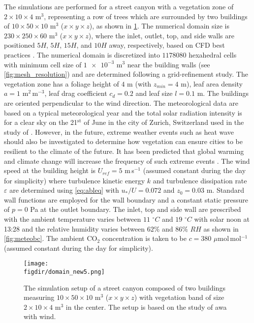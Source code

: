 The simulations are performed for a street canyon with a vegetation zone of $2 \times 10 \times 4$ m$^3$, representing a row of trees which are surrounded by two buildings of $10 \times 50 \times 10$ m$^3$ ($x\times y \times z$), as shown in \cref{fig:domain_new5}. The numerical domain size is $230\times 250 \times 60$ m$^3$  ($x\times y \times z$), where the inlet, outlet, top, and side walls are positioned $5 H$, $5 H$, $15 H$, and $10 H$ away, respectively, based on CFD best practices \citep{Blocken2015, Franke2007, Tominaga2008}. The numerical domain is discretized into $\num{1178080}$ hexahedral cells with minimum cell size of $\num{1e-3}$ m$^{3}$ near the building walls (see \cref{fig:mesh_resolution}) and are determined following a grid-refinement study. The vegetation zone has a foliage height of $4$ m (with $z_{\textit{min}}= 4$ m), leaf area density $a= 1$ m$^2$\,m$^{-3}$, leaf drag coefficient $c_d=0.2$ and leaf size $l=0.1$ m. The buildings are oriented perpendicular to the wind direction. The meteorological data are based on a typical meteorological year and the total solar radiation intensity is for a clear sky on the 21$^{\mathrm{st}}$ of June in the city of Zurich, Switzerland used in the study of \cite{Kubilay2018}. However, in the future, extreme weather events such as heat wave should also be investigated to determine how vegetation can ensure cities to be resilient to the climate of the future. It has been predicted that global warming and climate change will increase the frequency of such extreme events \citep{Mitchell2016}. The wind speed at the building height is $U_{\textit{ref}}=5$ m\,s$^{-1}$ (assumed constant during the day for simplicity) where turbulence kinetic energy $k$ and turbulence dissipation rate $\varepsilon$ are determined using \cref{eq:ableq} \citep{Richards1993} with $u_*/U = 0.072$ and $z_0 = 0.03$ m. Standard wall functions are employed for the wall boundary and a constant static pressure of $p=0$ Pa at the outlet boundary. The inlet, top and side wall are prescribed with the ambient temperature varies between $11$ $^{\circ}C$ and $19$ $^{\circ}C$ with solar noon at 13:28 and the relative humidity varies between $62\%$ and $86\%$ $RH$ as shown in \cref{fig:meteobc}. The ambient CO$_2$ concentration is taken to be $c=380$ $\mu$mol\,mol$^{-1}$ (assumed constant during the day for simplicity).

	\begin{figure}[p]
	\centering
	\texttt{[image: \\figdir/domain\_new5.png]}
	\caption{The simulation setup of a street canyon composed of two buildings measuring $10 \times 50 \times 10$ m$^3$ ($x\times y \times z$) with vegetation band of size $2 \times 10 \times 4$ m$^3$ in the center. The setup is based on the study of \cite{Kubilay2018} awa with wind.}
	\label{fig:domain_new5}
	\end{figure}


